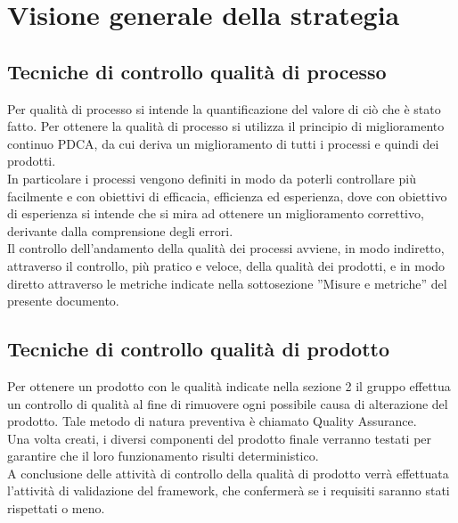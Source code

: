 
\section{Visione generale della strategia}
	\subsection{Tecniche di controllo qualità di processo}
		Per qualità di processo si intende la quantificazione del valore di ciò che è stato fatto. Per ottenere la qualità di processo si utilizza il 
		principio di miglioramento continuo PDCA, da cui deriva un miglioramento di tutti i processi e quindi dei prodotti.\\
		In particolare i processi vengono definiti in modo da poterli controllare più facilmente e con obiettivi di efficacia, efficienza ed esperienza, 
		dove con obiettivo di esperienza si intende che si mira ad ottenere un miglioramento correttivo, derivante dalla comprensione degli errori.\\
		Il controllo dell'andamento della qualità dei processi avviene, in modo indiretto, attraverso il controllo, più pratico e veloce, della qualità dei prodotti, e in modo diretto attraverso le metriche indicate nella sottosezione ''Misure e metriche'' del presente documento.
	\subsection{Tecniche di controllo qualità di prodotto}
		Per ottenere un prodotto con le qualità indicate nella sezione 2 il gruppo \groupname{} effettua un controllo di qualità al fine di rimuovere ogni possibile causa di alterazione del prodotto. Tale metodo di natura preventiva è chiamato Quality Assurance.\\
		Una volta creati, i diversi componenti del prodotto finale verranno testati per garantire che il loro funzionamento risulti deterministico.\\
		A conclusione delle attività di controllo della qualità di prodotto verrà effettuata l'attività di validazione del framework, che confermerà se i requisiti saranno stati rispettati o meno.
